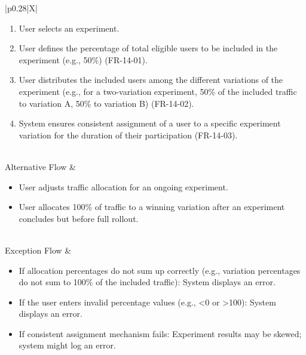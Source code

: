 \begin{minipage}{\textwidth}
\begin{tabularx}{\textwidth}{|p{0.28\textwidth}|X|}
{        
        \begin{enumerate}
            \item User selects an experiment.
            \item User defines the percentage of total eligible users to be included in the experiment (e.g., 50\%) (FR-14-01).
            \item User distributes the included users among the different variations of the experiment (e.g., for a two-variation experiment, 50\% of the included traffic to variation A, 50\% to variation B) (FR-14-02).
            \item System ensures consistent assignment of a user to a specific experiment variation for the duration of their participation (FR-14-03).
        \end{enumerate}%
        } \\
    \hline
    Alternative Flow &
        \parbox[t]{\linewidth}{%
        \begin{itemize}
            \item User adjusts traffic allocation for an ongoing experiment.
            \item User allocates 100\% of traffic to a winning variation after an experiment concludes but before full rollout.
        \end{itemize}%
        } \\
    \hline
    Exception Flow &
        \parbox[t]{\linewidth}{%
        \begin{itemize}
            \item If allocation percentages do not sum up correctly (e.g., variation percentages do not sum to 100\% of the included traffic): System displays an error.
            \item If the user enters invalid percentage values (e.g., <0 or >100): System displays an error.
            \item If consistent assignment mechanism fails: Experiment results may be skewed; system might log an error.
        \end{itemize}%
        } \\
    \hline
\end{tabularx}
\end{minipage}
\bigskip

